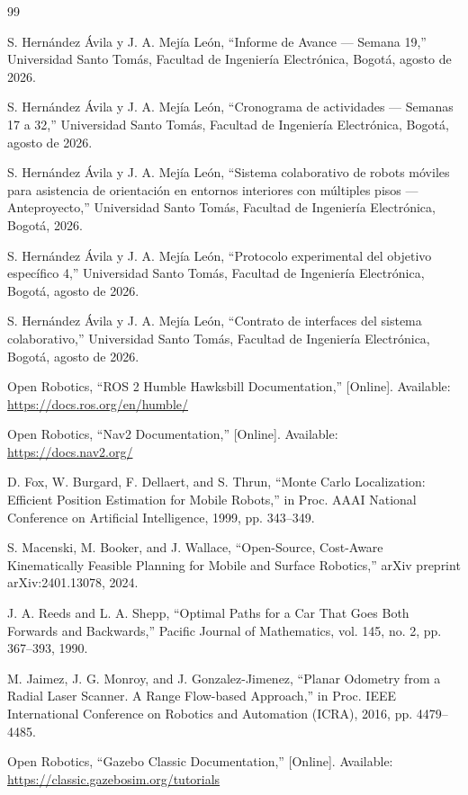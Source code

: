 \documentclass[12pt,letterpaper]{article}
\begin{document}
\begin{thebibliography}{99}

S. Hernández Ávila y J. A. Mejía León,
``Informe de Avance --- Semana 19,''
Universidad Santo Tomás, Facultad de Ingeniería Electrónica, Bogotá, agosto de 2026.

S. Hernández Ávila y J. A. Mejía León,
``Cronograma de actividades --- Semanas 17 a 32,''
Universidad Santo Tomás, Facultad de Ingeniería Electrónica, Bogotá, agosto de 2026.

S. Hernández Ávila y J. A. Mejía León,
``Sistema colaborativo de robots móviles para asistencia de orientación en entornos interiores con múltiples pisos --- Anteproyecto,''
Universidad Santo Tomás, Facultad de Ingeniería Electrónica, Bogotá, 2026.

S. Hernández Ávila y J. A. Mejía León,
``Protocolo experimental del objetivo específico 4,''
Universidad Santo Tomás, Facultad de Ingeniería Electrónica, Bogotá, agosto de 2026.

S. Hernández Ávila y J. A. Mejía León,
``Contrato de interfaces del sistema colaborativo,''
Universidad Santo Tomás, Facultad de Ingeniería Electrónica, Bogotá, agosto de 2026.

Open Robotics,
``ROS 2 Humble Hawksbill Documentation,''
[Online]. Available: \url{https://docs.ros.org/en/humble/}

Open Robotics,
``Nav2 Documentation,''
[Online]. Available: \url{https://docs.nav2.org/}

D. Fox, W. Burgard, F. Dellaert, and S. Thrun,
``Monte Carlo Localization: Efficient Position Estimation for Mobile Robots,''
in Proc. AAAI National Conference on Artificial Intelligence, 1999, pp. 343--349.

S. Macenski, M. Booker, and J. Wallace,
``Open-Source, Cost-Aware Kinematically Feasible Planning for Mobile and Surface Robotics,''
arXiv preprint arXiv:2401.13078, 2024.

J. A. Reeds and L. A. Shepp,
``Optimal Paths for a Car That Goes Both Forwards and Backwards,''
Pacific Journal of Mathematics, vol. 145, no. 2, pp. 367--393, 1990.

M. Jaimez, J. G. Monroy, and J. Gonzalez-Jimenez,
``Planar Odometry from a Radial Laser Scanner. A Range Flow-based Approach,''
in Proc. IEEE International Conference on Robotics and Automation (ICRA), 2016, pp. 4479--4485.

Open Robotics,
``Gazebo Classic Documentation,''
[Online]. Available: \url{https://classic.gazebosim.org/tutorials}

\end{thebibliography}
\end{document}
